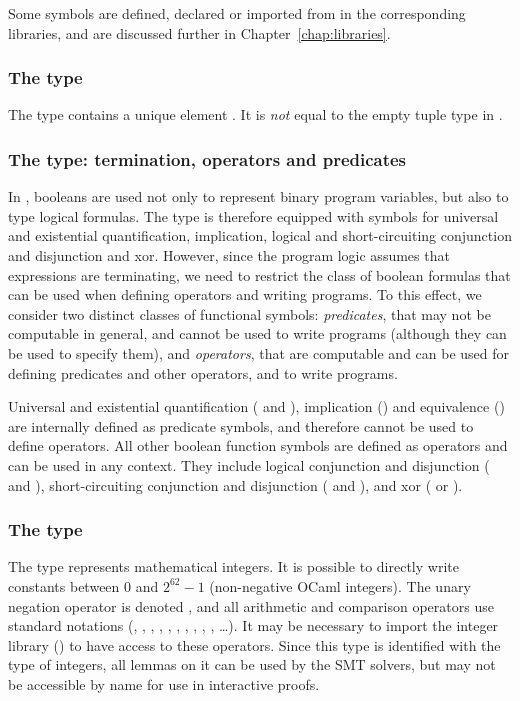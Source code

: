 Some symbols are defined, declared or imported from \WhyThree in the
corresponding libraries, and are discussed further in
Chapter~\ref{chap:libraries}.

\subsubsection*{The  type}
The  type contains a unique element . It is \emph{not}
equal to the empty tuple type in \EC.

\subsubsection*{The  type: termination, operators and predicates}
In \EC, booleans are used not only to represent binary program variables, but
also to type logical formulas. The  type is therefore equipped with
symbols for universal and existential quantification, implication, logical and
short-circuiting conjunction and disjunction and xor. However, since the program
logic assumes that expressions are terminating, we need to restrict the class of
boolean formulas that can be used when defining operators and writing programs.
To this effect, we consider two distinct classes of functional symbols:
\emph{predicates}, that may not be computable in general, and cannot be used to
write programs (although they can be used to specify them), and
\emph{operators}, that are computable and can be used for defining predicates
and other operators, and to write programs.

Universal and existential quantification ( and ),
implication (\rawec{=>}) and equivalence (\rawec{<=>}) are internally defined as
predicate symbols, and therefore cannot be used to define operators. All other
boolean function symbols are defined as operators and can be used in any
context. They include logical conjunction and disjunction (\rawec{/\\} and
\rawec{\\\/}), short-circuiting conjunction and disjunction (\rawec{\&\&} and
\rawec{\|\|}), and xor (\rawec{+} or \rawec{\^\^}).

\subsubsection*{The  type}
The  type represents mathematical integers. It is possible to
directly write constants between $0$ and $2^{62} - 1$ (non-negative OCaml
integers). The unary negation operator is denoted \rawec{-!}, and all arithmetic
and comparison operators use standard notations (\rawec{+}, \rawec{-},
\rawec{*}, \rawec{/}, \rawec{\%}, \rawec{^}, \rawec{=}, \rawec{<}, \rawec{<=},
\rawec{>}, \rawec{>=} \ldots). It may be necessary to import the integer library
() to have access to these operators. Since this type
is identified with the \WhyThree type of integers, all \WhyThree lemmas on it
can be used by the SMT solvers, but may not be accessible by name for use in
interactive proofs.

